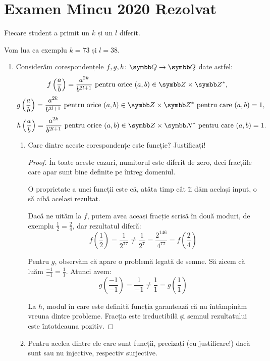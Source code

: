 \section*{Examen Mincu 2020 Rezolvat}

Fiecare student a primit un \(k\) și un \(l\) diferit.

Vom lua ca exemplu \(k = 73\) și \(l = 38\).

\begin{enumerate}
\item Considerăm corespondențele \(f, g, h \colon \rationals \to \rationals\) date astfel:
\[
f\left(\frac{a}{b}\right) = \frac{a^{2k}}{b^{2l + 1}} \text{ pentru orice } (a, b) \in \integers \times \integers^*,
\]
\[
g\left(\frac{a}{b}\right) = \frac{a^{2k}}{b^{2l + 1}} \text{ pentru orice } (a, b) \in \integers \times \integers^* \text{ pentru care } (a, b) = 1,
\]
\[
h\left(\frac{a}{b}\right) = \frac{a^{2k}}{b^{2l + 1}} \text{ pentru orice } (a, b) \in \integers \times \naturals^* \text{ pentru care } (a, b) = 1.
\]

\begin{enumerate}
    \item Care dintre aceste corespondențe este funcție? Justificați!
    \begin{proof}
    În toate aceste cazuri, numitorul este diferit de zero, deci fracțiile care apar sunt bine definite pe întreg domeniul.

    O proprietate a unei funcții este că, atâta timp cât îi dăm același input, o să aibă același rezultat.

    Dacă ne uităm la \(f\), putem avea aceași fracție scrisă în două moduri, de exemplu \(\frac{1}{2} = \frac{2}{4}\), dar rezultatul diferă:
    \[f\left(\frac{1}{2}\right) = \frac{1}{2^{77}} \neq \frac{1}{2^7} = \frac{2^{146}}{4^{77}} = f\left(\frac{2}{4}\right)\]

    Pentru \(g\), observăm că apare o problemă legată de semne. Să zicem că luăm \(\frac{-1}{-1} = \frac{1}{1}\). Atunci avem:
    \[g\left(\frac{-1}{-1}\right) = \frac{1}{-1} \neq \frac{1}{1} = g\left(\frac{1}{1}\right)\]

    La \(h\), modul în care este definită funcția garantează că nu întâmpinăm vreuna dintre probleme. Fracția este ireductibilă și semnul rezultatului este întotdeauna pozitiv.
    \end{proof}

    \item Pentru acelea dintre ele care sunt funcții, precizați (cu justificare!) dacă sunt sau nu injective, respectiv surjective.


\end{enumerate}
\end{enumerate}
